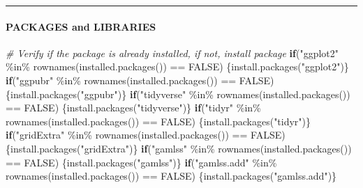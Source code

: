\documentclass[
]{article}
\newenvironment{Shaded}{\begin{snugshade}}{\end{snugshade}}
\newcommand{\CommentTok}[1]{\textcolor[rgb]{0.56,0.35,0.01}{\textit{#1}}}
\newcommand{\ConstantTok}[1]{\textcolor[rgb]{0.00,0.00,0.00}{#1}}
\newcommand{\ControlFlowTok}[1]{\textcolor[rgb]{0.13,0.29,0.53}{\textbf{#1}}}
\newcommand{\FunctionTok}[1]{\textcolor[rgb]{0.00,0.00,0.00}{#1}}
\newcommand{\NormalTok}[1]{#1}
\newcommand{\SpecialCharTok}[1]{\textcolor[rgb]{0.00,0.00,0.00}{#1}}
\newcommand{\StringTok}[1]{\textcolor[rgb]{0.31,0.60,0.02}{#1}}
\begin{document}
\begin{center}\rule{0.5\linewidth}{0.5pt}\end{center}

\hypertarget{packages-and-libraries}{%
\paragraph{PACKAGES and LIBRARIES}\label{packages-and-libraries}}

\begin{Shaded}
\begin{Highlighting}[]
\CommentTok{\# Verify if the package is already installed, if not, install package}
\ControlFlowTok{if}\NormalTok{(}\StringTok{"ggplot2"} \SpecialCharTok{\%in\%} \FunctionTok{rownames}\NormalTok{(}\FunctionTok{installed.packages}\NormalTok{()) }\SpecialCharTok{==} \ConstantTok{FALSE}\NormalTok{) \{}\FunctionTok{install.packages}\NormalTok{(}\StringTok{"ggplot2"}\NormalTok{)\}}
\ControlFlowTok{if}\NormalTok{(}\StringTok{"ggpubr"} \SpecialCharTok{\%in\%} \FunctionTok{rownames}\NormalTok{(}\FunctionTok{installed.packages}\NormalTok{()) }\SpecialCharTok{==} \ConstantTok{FALSE}\NormalTok{) \{}\FunctionTok{install.packages}\NormalTok{(}\StringTok{"ggpubr"}\NormalTok{)\}}
\ControlFlowTok{if}\NormalTok{(}\StringTok{"tidyverse"} \SpecialCharTok{\%in\%} \FunctionTok{rownames}\NormalTok{(}\FunctionTok{installed.packages}\NormalTok{()) }\SpecialCharTok{==} \ConstantTok{FALSE}\NormalTok{) \{}\FunctionTok{install.packages}\NormalTok{(}\StringTok{"tidyverse"}\NormalTok{)\}}
\ControlFlowTok{if}\NormalTok{(}\StringTok{"tidyr"} \SpecialCharTok{\%in\%} \FunctionTok{rownames}\NormalTok{(}\FunctionTok{installed.packages}\NormalTok{()) }\SpecialCharTok{==} \ConstantTok{FALSE}\NormalTok{) \{}\FunctionTok{install.packages}\NormalTok{(}\StringTok{"tidyr"}\NormalTok{)\}}
\ControlFlowTok{if}\NormalTok{(}\StringTok{"gridExtra"} \SpecialCharTok{\%in\%} \FunctionTok{rownames}\NormalTok{(}\FunctionTok{installed.packages}\NormalTok{()) }\SpecialCharTok{==} \ConstantTok{FALSE}\NormalTok{) \{}\FunctionTok{install.packages}\NormalTok{(}\StringTok{"gridExtra"}\NormalTok{)\}}
\ControlFlowTok{if}\NormalTok{(}\StringTok{"gamlss"} \SpecialCharTok{\%in\%} \FunctionTok{rownames}\NormalTok{(}\FunctionTok{installed.packages}\NormalTok{()) }\SpecialCharTok{==} \ConstantTok{FALSE}\NormalTok{) \{}\FunctionTok{install.packages}\NormalTok{(}\StringTok{"gamlss"}\NormalTok{)\}}
\ControlFlowTok{if}\NormalTok{(}\StringTok{"gamlss.add"} \SpecialCharTok{\%in\%} \FunctionTok{rownames}\NormalTok{(}\FunctionTok{installed.packages}\NormalTok{()) }\SpecialCharTok{==} \ConstantTok{FALSE}\NormalTok{) \{}\FunctionTok{install.packages}\NormalTok{(}\StringTok{"gamlss.add"}\NormalTok{)\}}

\end{Highlighting}
\end{Shaded}
\end{document}
